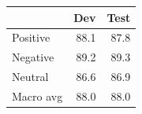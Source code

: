 \begin{tabular}{lrr}
\toprule
{} &  Dev &  Test \\
\midrule
Positive  & 88.1 &  87.8 \\
Negative  & 89.2 &  89.3 \\
Neutral   & 86.6 &  86.9 \\
Macro avg & 88.0 &  88.0 \\
\bottomrule
\end{tabular}
